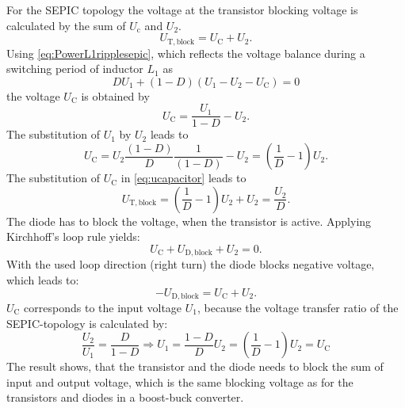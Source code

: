 \begin{solutionblock}
    For the SEPIC topology the voltage at the transistor blocking voltage is calculated by the sum of 
    $U_\mathrm{c}$ and $U_\mathrm{2}$.
    \begin{equation}
        U_\mathrm{T,block}=U_\mathrm{C}+U_\mathrm{2}.
    \end{equation}
    Using \eqref{eq:PowerL1ripplesepic}, which reflects the voltage balance during a switching period 
    of inductor $L_1$ as
    \begin{equation}
        DU_\mathrm{1}+\left(1-D\right)\left(U_\mathrm{1}-U_\mathrm{2}-U_\mathrm{C}\right)=0
    \end{equation}
    the voltage $U_\mathrm{C}$ is obtained by
    \begin{equation}
        U_\mathrm{C}=\frac{U_\mathrm{1}}{1-D}-U_\mathrm{2}.
    \end{equation}
    The substitution of $U_\mathrm{1}$ by $U_\mathrm{2}$ leads to
    \begin{equation}
        U_\mathrm{C}=U_\mathrm{2}\frac{\left(1-D\right)}{D}\frac{1}{\left(1-D\right)}-U_\mathrm{2}
        =\left( \frac{1}{D}-1\right) U_\mathrm{2}.
        \label{eq:ucapacitor}        
    \end{equation}
    The substitution of $U_\mathrm{C}$ in \eqref{eq:ucapacitor} leads to 
    \begin{equation}
        U_\mathrm{T,block}=\left( \frac{1}{D}-1\right) U_\mathrm{2}+U_\mathrm{2}=\frac{U_\mathrm{2}}{D}.
    \end{equation}
    The diode has to block the voltage, when the transistor is active. Applying Kirchhoff's loop rule yields:
    \begin{equation}
        U_\mathrm{C}+U_\mathrm{D,block}+U_\mathrm{2}=0.
    \end{equation}
    With the used loop direction (right turn) the diode blocks negative voltage, which leads to:
    \begin{equation}
        -U_\mathrm{D,block}=U_\mathrm{C}+U_\mathrm{2}.
    \end{equation}
    $U_\mathrm{C}$ corresponds to the input voltage $U_\mathrm{1}$, because the voltage transfer ratio of the SEPIC-topology
    is calculated by:
    \begin{equation}
        \frac{U_\mathrm{2}}{U_\mathrm{1}}= \frac{D}{1-D} \Rightarrow
        U_\mathrm{1}=\frac{1-D}{D}U_\mathrm{2}=\left( \frac{1}{D}-1\right)U_\mathrm{2}=U_\mathrm{C}
    \end{equation}
    The result shows, that the transistor and the diode needs to block the sum of input and output voltage, 
    which is the same blocking voltage as for the transistors and diodes in a boost-buck converter.
\end{solutionblock}


